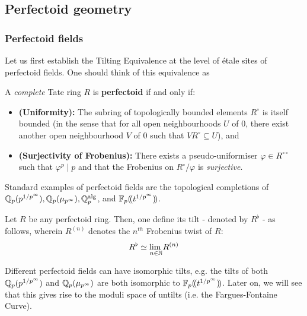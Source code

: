         \subsection{Perfectoid geometry}
            \subsubsection{Perfectoid fields}
    	        Let us first establish the Tilting Equivalence at the level of \'etale sites of perfectoid fields. One should think of this equivalence as  
    	    
        	    \begin{definition} \label{def: perfectoid_rings}
                    A \textit{complete} Tate ring $R$ is \textbf{perfectoid} if and only if:
                        \begin{itemize}
                            \item \textbf{(Uniformity):} The subring of topologically bounded elements $R^{\circ}$ is itself bounded (in the sense that for all open neighbourhoods $U$ of $0$, there exist another open neighbourhood $V$ of $0$ such that $VR^{\circ} \subseteq U$), and 
                            \item \textbf{(Surjectivity of Frobenius):} There exists a pseudo-uniformiser $\varphi \in R^{\circ \circ}$ such that $\varphi^p \mid p$ and that the Frobenius on $R^{\circ}/\varphi$ is \textit{surjective}.
                        \end{itemize}
                \end{definition}
                \begin{example}
                    Standard examples of perfectoid fields are the topological completions of $\mathbb{Q}_p(p^{1/p^{\infty}}), \mathbb{Q}_p(\mu_{p^{\infty}}), \mathbb{Q}_p^{\mathrm{alg}}$, and $\mathbb{F}_p(\!(t^{1/p^{\infty}})\!)$.
                \end{example}
                
                \begin{definition}[Tilts] \label{def: tilts}
                    Let $R$ be any perfectoid ring. Then, one define its tilt - denoted by $R^{\flat}$ - as follows, wherein $R^{(n)}$ denotes the $n^{th}$ Frobenius twist of $R$:
                        $$R^{\flat} \simeq \underset{n \in \mathbb{N}}{\operatorname{lim} \:} R^{(n)}$$
                \end{definition}
                \begin{example}
                    Different perfectoid fields can have isomorphic tilts, e.g. the tilts of both $\mathbb{Q}_p(p^{1/p^{\infty}})$ and $\mathbb{Q}_p(\mu_{p^{\infty}})$ are both isomorphic to $\mathbb{F}_p(\!(t^{1/p^{\infty}})\!)$. Later on, we will see that this gives rise to the moduli space of untilts (i.e. the Fargues-Fontaine Curve).
                \end{example}
                
